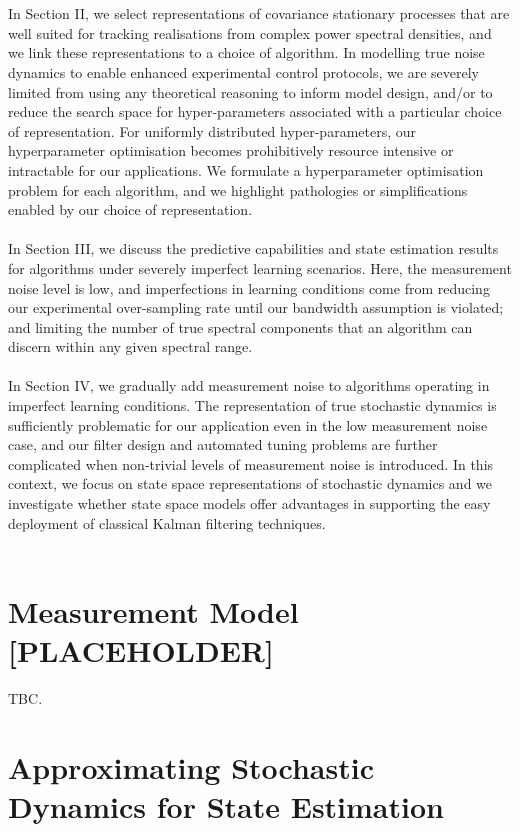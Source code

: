 \\
\\
In Section II, we select representations of covariance stationary processes that are well suited for tracking realisations from complex power spectral densities, and we link these representations to a choice of algorithm. In modelling true noise dynamics to enable enhanced experimental control protocols, we are severely limited from using any theoretical reasoning to inform model design, and/or to reduce the search space for hyper-parameters associated with a particular choice of representation. For uniformly distributed hyper-parameters, our hyperparameter optimisation becomes prohibitively resource intensive or intractable for our applications. We formulate a hyperparameter optimisation problem for each algorithm, and we highlight pathologies or simplifications enabled by our choice of representation. 
\\
\\
In Section III, we discuss the predictive capabilities and state estimation results for algorithms under severely imperfect learning scenarios. Here, the measurement noise level is low, and imperfections in learning conditions come from reducing our experimental over-sampling rate until our bandwidth assumption is violated; and limiting the number of true spectral components that an algorithm can discern within any given spectral range.
\\
\\
In Section IV, we gradually add measurement noise to algorithms operating in imperfect learning conditions. The representation of true stochastic dynamics is sufficiently problematic for our application even in the low measurement noise case, and our filter design and automated tuning problems are further complicated when non-trivial levels of measurement noise is introduced. In this context, we focus on state space representations of stochastic dynamics and we investigate whether state space models offer advantages in supporting the easy deployment of classical Kalman filtering techniques.
\\
\\
\section{Measurement Model [PLACEHOLDER]}
TBC.
\section{Approximating Stochastic Dynamics for State Estimation} \label{sec:main_A}

